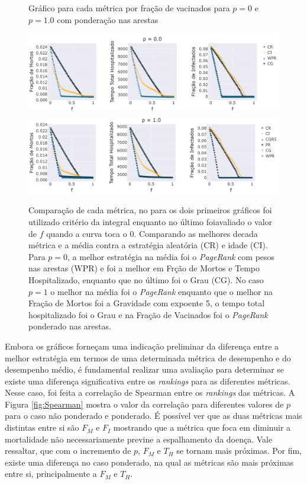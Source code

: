 \begin{figure}[H]
    \centering
    \captionsetup{font=normalsize,skip=0.8pt,singlelinecheck=on,labelsep=endash}
    \caption{Gráfico para cada métrica por fração de vacinados para $p = 0$ e $p = 1.0$ com ponderação nas arestas}
    \includegraphics[scale= 0.3]{figuras/compara_p_f_ponderado_0.0.png}
    \includegraphics[scale= 0.3]{figuras/compara_p_f_ponderado_1.0.png}

    \captionsetup{font=small,justification=justified}
    
    \caption*{Comparação de cada métrica, no para os dois primeiros gráficos foi utilizado  critério da integral enquanto no último foiavaliado o valor de $f$ quando a curva toca o 0. Comparando as melhores decada métrica e a média contra a estratégia aleatória (CR) e  idade (CI). Para $p = 0$, a melhor estratégia 
    na média
    foi o \textit{PageRank} com pesos nas arestas (WPR) e foi a melhor em Frção de Mortos e Tempo Hospitalizado, enquanto que no último foi o Grau (CG). No caso $p = 1$ o melhor na média foi o \textit{PageRank} enquanto que o melhor na Fração de Mortos foi a Gravidade com expoente 5, o tempo total hospitalizado foi o Grau e na Fração de Vacinados foi o \textit{PageRank} ponderado nas arestas. }
    \label{fig:resultados_metricas_ponderado}
\end{figure}

Embora os gráficos forneçam uma indicação preliminar da diferença entre a melhor estratégia em termos de 
uma determinada métrica de desempenho
e do desempenho médio, é fundamental realizar uma avaliação para determinar se existe uma diferença significativa entre 
os \textit{rankings} para as diferentes métricas. Nesse caso, 
foi
feita a correlação de Spearman entre 
os \textit{rankings}
das métricas. A Figura \ref{fig:Spearman} mostra o valor da correlação para diferentes valores de $p$ para o caso não ponderado e ponderado. É possível ver que as duas métricas mais distintas entre si são $F_M$ e $F_I$ mostrando que a métrica que foca em diminuir a mortalidade 
não necessariamente previne a espalhamento da doença. 
Vale ressaltar, que com o incremento de $p$, $F_M$ e $T_H$ se tornam mais próximas.
Por fim, existe uma diferença no caso ponderado, na qual as métricas são mais próximas entre si, principalmente a $F_M$ e $T_H$.

